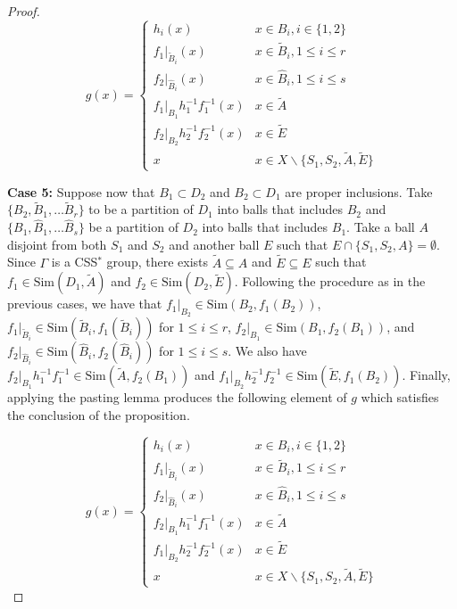 \documentclass[12pt]{amsart}
\numberwithin{equation}{subsection}
\theoremstyle{definition}
\theoremstyle{definition}
\theoremstyle{remark}
\begin{document}
\begin{proof}
     \[ g(x) = \begin{cases} h_i(x) & x \in B_i, i\in\{1,2\}  \\
     f_1\vert_{\tilde B_i}(x) & x \in \tilde B_i, 1 \leq i \leq r\\
      f_2\vert_{\hat B_i}(x) & x \in \hat B_i, 1 \leq i \leq s\\
    f_1\vert_{B_1}h_1^{-1}f_1^{-1} (x) & x\in \tilde A\\
    f_2\vert_{B_2}h_2^{-1}f_2^{-1} (x) & x\in \tilde E\\
    x & x \in X \backslash \{S_1, S_2, \tilde A, \tilde E\}
    \end{cases}
    \]
    

    
    \noindent\textbf{Case 5:}
    Suppose now that $B_1 \subset D_2$ and $B_2 \subset D_1$ are proper inclusions.  Take $\{B_2, \tilde B_1, \dots \tilde B_r \}$ to be a partition of $D_1$ into balls that includes $B_2$ and $\{B_1, \hat B_1, \dots \hat B_s \}$ be a partition of $D_2$ into balls that includes $B_1$. Take a ball $A$ disjoint from both $S_1$ and $S_2$ and another ball $E$ such that $E \cap \{S_1, S_2, A\} = \emptyset$. Since $\Gamma$ is a CSS$^*$ group, there exists $\tilde A \subseteq A$ and $\tilde E \subseteq E$ such that $f_1 \in \text{Sim}(D_1, \tilde A)$ and $f_2 \in \text{Sim}(D_2, \tilde E)$. Following the procedure as in the previous cases, we have that $f_1\vert_{B_2} \in \text{Sim}(B_2, f_1(B_2))$,  $f_1\vert_{\tilde B_i} \in \text{Sim}(\tilde B_i, f_1(\tilde B_i))$ for $1 \leq i \leq r$, $f_2\vert_{B_1} \in \text{Sim}(B_1, f_2(B_1))$, and $f_2\vert_{\hat B_i} \in \text{Sim}(\hat B_i, f_2(\hat B_i))$ for $1 \leq i \leq s$.  We also have $f_2\vert_{B_1}h_1^{-1}f_1^{-1} \in \text{Sim}(\tilde A,f_2(B_1))$ and $f_1\vert_{B_2}h_2^{-1}f_2^{-1} \in \text{Sim}(\tilde E, f_1(B_2))$. Finally, applying the pasting lemma produces the following element of $g$ which satisfies the conclusion of the proposition.  

    \[ g(x) = \begin{cases} h_i(x) & x \in B_i, i\in\{1,2\}  \\
     f_1\vert_{\tilde B_i}(x) & x \in \tilde B_i, 1 \leq i \leq r\\
      f_2\vert_{\hat B_i}(x) & x \in \hat B_i, 1 \leq i \leq s\\
    f_2\vert_{B_1}h_1^{-1}f_1^{-1} (x) & x\in \tilde A\\
    f_1\vert_{B_2}h_2^{-1}f_2^{-1} (x) & x\in \tilde E\\
    x & x \in X \backslash \{S_1, S_2, \tilde A, \tilde E\}
    \end{cases}
    \]



\end{proof}
\end{document}
